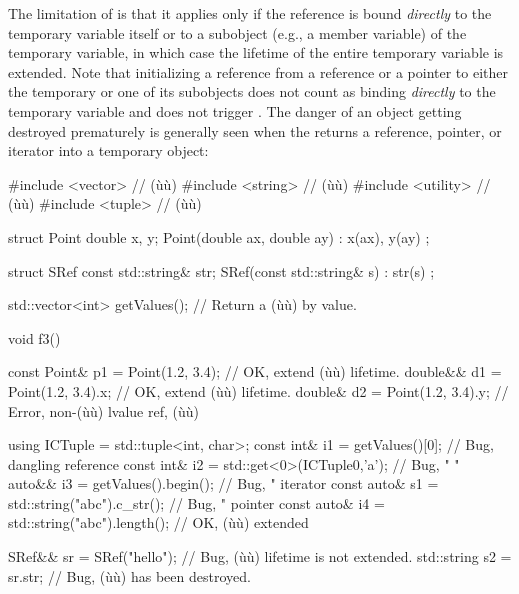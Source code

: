 {{{The limitation of  is that it applies only if
the reference is bound \emph{directly} to the temporary variable itself
or to a subobject (e.g., a member variable) of the temporary variable,
in which case the lifetime of the entire temporary variable is extended.
Note that initializing a reference from a reference or a pointer to
either the temporary or one of its subobjects does not count as binding
\emph{directly} to the temporary variable and does not trigger
. The danger of an object getting destroyed
prematurely is generally seen when the  returns
a reference, pointer, or iterator into a temporary object:

\begin{emcppslisting}
#include <vector>   // (ù{}ù)
#include <string>   // (ù{}ù)
#include <utility>  // (ù{}ù)
#include <tuple>    // (ù{}ù)

struct Point
{
    double x, y;
    Point(double ax, double ay) : x(ax), y(ay) { }
};

struct SRef
{
    const std::string& str;
    SRef(const std::string& s) : str(s) { }
};

std::vector<int> getValues();  // Return a (ù{}ù) by value.

void f3()
{
    const Point& p1 = Point(1.2, 3.4);    // OK, extend (ù{}ù) lifetime.
    double&&     d1 = Point(1.2, 3.4).x;  // OK, extend (ù{}ù) lifetime.
    double&      d2 = Point(1.2, 3.4).y;  // Error, non-(ù{}ù) lvalue ref, (ù{}ù)

    using ICTuple = std::tuple<int, char>;
    const int&  i1 = getValues()[0];               // Bug, dangling reference
    const int&  i2 = std::get<0>(ICTuple{0,'a'});  // Bug,     "        "
    auto&&      i3 = getValues().begin();          // Bug,     "    iterator
    const auto& s1 = std::string("abc").c_str();   // Bug,     "    pointer
    const auto& i4 = std::string("abc").length();  // OK, (ù{}ù) extended

    SRef&&      sr = SRef("hello");  // Bug, (ù{}ù) lifetime is not extended.
    std::string s2 = sr.str;         // Bug, (ù{}ù) has been destroyed.
}
\end{emcppslisting}
    

}}}
